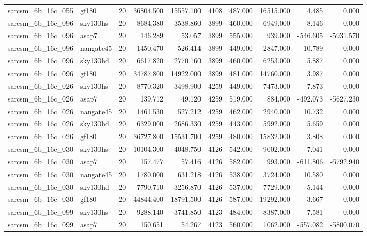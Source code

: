\begin{tabular}{llrrrrrrrr}
sarcsm\_6b\_16c\_055 & gf180 & 20 & 36804.500 & 15557.100 & 4108 & 487.000 & 16515.000 & 4.485 & 0.000 \\
sarcsm\_6b\_16c\_096 & sky130hs & 20 & 8684.380 & 3538.860 & 3899 & 460.000 & 6949.000 & 8.146 & 0.000 \\
sarcsm\_6b\_16c\_096 & asap7 & 20 & 146.289 & 53.057 & 3899 & 555.000 & 939.000 & -546.605 & -5931.570 \\
sarcsm\_6b\_16c\_096 & nangate45 & 20 & 1450.470 & 526.414 & 3899 & 449.000 & 2847.000 & 10.789 & 0.000 \\
sarcsm\_6b\_16c\_096 & sky130hd & 20 & 6617.820 & 2770.160 & 3899 & 460.000 & 6253.000 & 5.887 & 0.000 \\
sarcsm\_6b\_16c\_096 & gf180 & 20 & 34787.800 & 14922.000 & 3899 & 481.000 & 14760.000 & 3.987 & 0.000 \\
sarcsm\_6b\_16c\_026 & sky130hs & 20 & 8770.320 & 3498.900 & 4259 & 449.000 & 7473.000 & 7.873 & 0.000 \\
sarcsm\_6b\_16c\_026 & asap7 & 20 & 139.712 & 49.120 & 4259 & 519.000 & 884.000 & -492.073 & -5627.230 \\
sarcsm\_6b\_16c\_026 & nangate45 & 20 & 1461.530 & 527.212 & 4259 & 462.000 & 2940.000 & 10.732 & 0.000 \\
sarcsm\_6b\_16c\_026 & sky130hd & 20 & 6329.000 & 2686.330 & 4259 & 443.000 & 5992.000 & 5.659 & 0.000 \\
sarcsm\_6b\_16c\_026 & gf180 & 20 & 36727.800 & 15531.700 & 4259 & 480.000 & 15832.000 & 3.808 & 0.000 \\
sarcsm\_6b\_16c\_030 & sky130hs & 20 & 10104.300 & 4048.750 & 4126 & 542.000 & 9002.000 & 7.041 & 0.000 \\
sarcsm\_6b\_16c\_030 & asap7 & 20 & 157.477 & 57.416 & 4126 & 582.000 & 993.000 & -611.806 & -6792.940 \\
sarcsm\_6b\_16c\_030 & nangate45 & 20 & 1780.000 & 631.218 & 4126 & 538.000 & 3724.000 & 10.580 & 0.000 \\
sarcsm\_6b\_16c\_030 & sky130hd & 20 & 7790.710 & 3256.870 & 4126 & 537.000 & 7729.000 & 5.144 & 0.000 \\
sarcsm\_6b\_16c\_030 & gf180 & 20 & 44844.400 & 18791.500 & 4126 & 587.000 & 19292.000 & 3.667 & 0.000 \\
sarcsm\_6b\_16c\_099 & sky130hs & 20 & 9288.140 & 3741.850 & 4123 & 484.000 & 8387.000 & 7.581 & 0.000 \\
sarcsm\_6b\_16c\_099 & asap7 & 20 & 150.651 & 54.267 & 4123 & 560.000 & 1062.000 & -557.082 & -5800.070 \\

\end{tabular}
